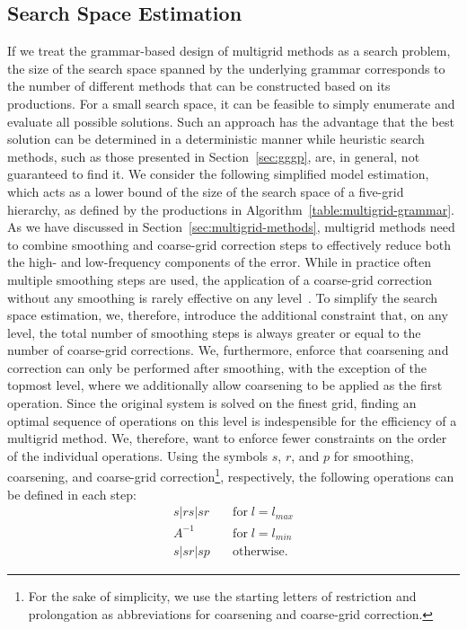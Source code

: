 \subsection{Search Space Estimation}
\label{sec:search-space-estimation}
If we treat the grammar-based design of multigrid methods as a search problem, the size of the search space spanned by the underlying grammar corresponds to the number of different methods that can be constructed based on its productions.
For a small search space, it can be feasible to simply enumerate and evaluate all possible solutions. 
Such an approach has the advantage that the best solution can be determined in a deterministic manner while heuristic search methods, such as those presented in Section~\ref{sec:gggp}, are, in general, not guaranteed to find it.
We consider the following simplified model estimation, which acts as a lower bound of the size of the search space of a five-grid hierarchy, as defined by the productions in Algorithm~\ref{table:multigrid-grammar}. 
As we have discussed in Section~\ref{sec:multigrid-methods}, multigrid methods need to combine smoothing and coarse-grid correction steps to effectively reduce both the high- and low-frequency components of the error.
While in practice often multiple smoothing steps are used, the application of a coarse-grid correction without any smoothing is rarely effective on any level~\cite{trottenberg2000multigrid}.
To simplify the search space estimation, we, therefore, introduce the additional constraint that, on any level, the total number of smoothing steps is always greater or equal to the number of coarse-grid corrections.
We, furthermore, enforce that coarsening and correction can only be performed after smoothing, with the exception of the topmost level, where we additionally allow coarsening to be applied as the first operation.
Since the original system is solved on the finest grid, finding an optimal sequence of operations on this level is indespensible for the efficiency of a multigrid method.
We, therefore, want to enforce fewer constraints on the order of the individual operations.
Using the symbols $s$, $r$, and $p$ for smoothing, coarsening, and coarse-grid correction\footnote{For the sake of simplicity, we use the starting letters of restriction and prolongation as abbreviations for coarsening and coarse-grid correction.}, respectively, the following operations can be defined in each step:
\begin{equation}\tag{4.8}
\begin{split}
	s | rs | sr & \quad \text{for} \; l = l_{max} \\
	A^{-1} & \quad \text{for} \; l = l_{min} \\
	s | sr | sp & \quad \text{otherwise}.
\end{split}
\end{equation}
